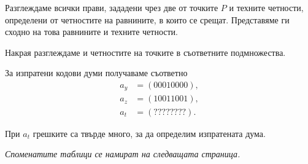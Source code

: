 \documentclass[11pt, oneside]{article}   	%
\begin{document}
Разглеждаме всички прави, зададени чрез две от точките $P$ и техните четности, определени от четностите на равнините, в които се срещат. Представяме ги сходно на това равнините и техните четности.

Накрая разглеждаме и четностите на точките в съответните подмножества.

За изпратени кодови думи получаваме съответно
\begin{align*}
a_{y} &= (00010000), \\
a_{z} &= (10011001), \\ 
a_{t} &= (????????).
\end{align*}

При $a_{t}$ грешките са твърде много, за да определим изпратената дума.

\textit{Споменатите таблици се намират на следващата страница.}
\end{document}
